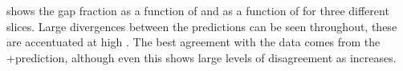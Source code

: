  shows the gap fraction
as a  function of \DeltaY and as a function of \Qnought for three different \DeltaY
slices. Large divergences between the \MC predictions can be seen throughout, these
are accentuated at high \DeltaY. The best agreement with the data comes from the
\Powheg+\Pythia prediction, although even this shows large levels of disagreement
as \DeltaY increases.

\begin{figure}[htpb]
  \quad
\end{figure}
